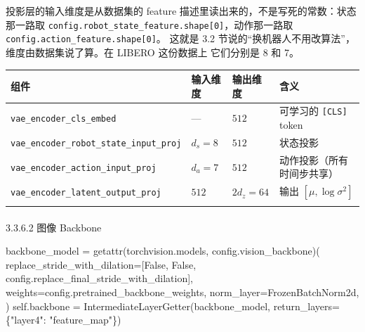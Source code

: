 \documentclass[
  chinese,
]{ctexart}
\makeatletter
\let\oldparagraph\paragraph
\renewcommand{\paragraph}{
    \@ifstar
      \xxxParagraphStar
      \xxxParagraphNoStar
  }
\newcommand{\xxxParagraphStar}[1]{\oldparagraph*{#1}\mbox{}}
\newcommand{\xxxParagraphNoStar}[1]{\oldparagraph{#1}\mbox{}}
\newenvironment{Shaded}{\begin{snugshade}}{\end{snugshade}}
\newcommand{\BuiltInTok}[1]{\textcolor[rgb]{0.00,0.23,0.31}{#1}}
\newcommand{\NormalTok}[1]{\textcolor[rgb]{0.00,0.23,0.31}{#1}}
\newcommand{\OperatorTok}[1]{\textcolor[rgb]{0.37,0.37,0.37}{#1}}
\newcommand{\StringTok}[1]{\textcolor[rgb]{0.13,0.47,0.30}{#1}}
\newcommand{\VariableTok}[1]{\textcolor[rgb]{0.07,0.07,0.07}{#1}}
\makeatother
\begin{document}
投影层的输入维度是从数据集的 feature
描述里读出来的，不是写死的常数：状态那一路取
\texttt{config.robot\_state\_feature.shape{[}0{]}}，动作那一路取
\texttt{config.action\_feature.shape{[}0{]}}。 这就是 3.2
节说的``换机器人不用改算法''，维度由数据集说了算。在 LIBERO 这份数据上
它们分别是 8 和 7。

\begin{center}
\begin{tabular}{@{}>{\raggedright\arraybackslash}p{} >{\raggedright\arraybackslash}p{} >{\raggedright\arraybackslash}p{} >{\raggedright\arraybackslash}p{}@{}}
\toprule\noalign{}
组件 & 输入维度 & 输出维度 & 含义 \\
\midrule\noalign{}
\texttt{vae\_\allowbreak encoder\_\allowbreak cls\_\allowbreak embed} & --- & \(512\) & 可学习的 \texttt{{[}CLS{]}} token \\
\texttt{vae\_\allowbreak encoder\_\allowbreak robot\_\allowbreak state\_\allowbreak input\_\allowbreak proj} & \(d_s = 8\) & \(512\) & 状态投影 \\
\texttt{vae\_\allowbreak encoder\_\allowbreak action\_\allowbreak input\_\allowbreak proj} & \(d_a = 7\) & \(512\) & 动作投影（所有时间步共享） \\
\texttt{vae\_\allowbreak encoder\_\allowbreak latent\_\allowbreak output\_\allowbreak proj} & \(512\) & \(2 d_z = 64\) & 输出 \([\mu, \log\sigma^2]\) \\
\bottomrule\noalign{}
\end{tabular}
\end{center}

\paragraph{3.3.6.2 图像 Backbone}\label{ux56feux50cf-backbone}

\begin{Shaded}
\begin{Highlighting}[]
\NormalTok{backbone\_model }\OperatorTok{=} \BuiltInTok{getattr}\NormalTok{(torchvision.models, config.vision\_backbone)(}
\NormalTok{    replace\_stride\_with\_dilation}\OperatorTok{=}\NormalTok{[}\VariableTok{False}\NormalTok{, }\VariableTok{False}\NormalTok{, config.replace\_final\_stride\_with\_dilation],}
\NormalTok{    weights}\OperatorTok{=}\NormalTok{config.pretrained\_backbone\_weights,}
\NormalTok{    norm\_layer}\OperatorTok{=}\NormalTok{FrozenBatchNorm2d,}
\NormalTok{)}
\VariableTok{self}\NormalTok{.backbone }\OperatorTok{=}\NormalTok{ IntermediateLayerGetter(backbone\_model, return\_layers}\OperatorTok{=}\NormalTok{\{}\StringTok{"layer4"}\NormalTok{: }\StringTok{"feature\_map"}\NormalTok{\})}
\end{Highlighting}
\end{Shaded}
\end{document}
